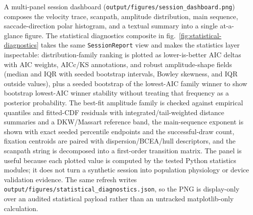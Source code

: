 \documentclass[
]{article}
\begin{document}
A multi-panel session dashboard
(\texttt{output/figures/session\_dashboard.png}) composes the velocity
trace, scanpath, amplitude distribution, main sequence,
saccade-direction polar histogram, and a textual summary into a single
at-a-glance figure. The statistical diagnostics composite in
fig.~\ref{fig:statistical-diagnostics} takes the same
\texttt{SessionReport} view and makes the statistics layer inspectable:
distribution-family ranking is plotted as lower-is-better AIC deltas
with AIC weights, AICc/KS annotations, and robust amplitude-shape fields
(median and IQR with seeded bootstrap intervals, Bowley skewness, and
IQR outside values), plus a seeded bootstrap of the lowest-AIC family
winner to show bootstrap lowest-AIC winner stability without treating
that frequency as a posterior probability. The best-fit amplitude family
is checked against empirical quantiles and fitted-CDF residuals with
integrated/tail-weighted distance summaries and a DKW/Massart reference
band, the main-sequence exponent is shown with exact seeded percentile
endpoints and the successful-draw count, fixation centroids are paired
with dispersion/BCEA/hull descriptors, and the scanpath string is
decomposed into a first-order transition matrix. The panel is useful
because each plotted value is computed by the tested Python statistics
modules; it does not turn a synthetic session into population physiology
or device validation evidence. The same refresh writes
\texttt{output/figures/statistical\_diagnostics.json}, so the PNG is
display-only over an audited statistical payload rather than an
untracked matplotlib-only calculation.
\end{document}
